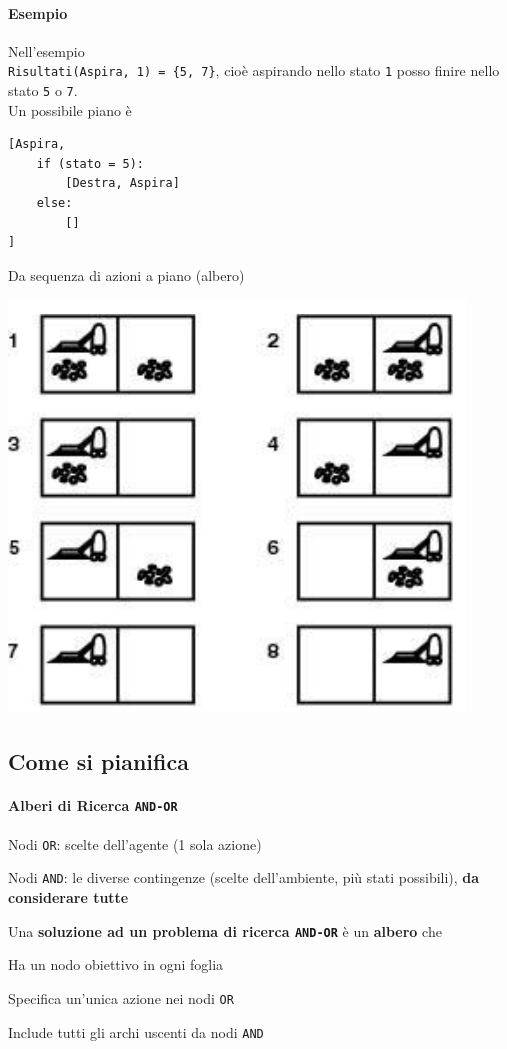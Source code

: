 \documentclass[10pt]{book}
\begin{document}
\paragraph{Esempio}
\begin{multicols}{2}
Nell'esempio\\\texttt{Risultati(Aspira, 1) = \{5, 7\}}, cioè aspirando nello stato \texttt{1} posso finire nello stato \texttt{5} o \texttt{7}.\\
Un possibile piano è
\begin{lstlisting}
[Aspira,
	if (stato = 5):
		[Destra, Aspira]
	else:
		[]
]
\end{lstlisting}
Da sequenza di azioni a piano (albero)
\begin{center}
	\includegraphics[scale=0.7]{aspirapolvereimprevedibile.png}
\end{center}
\end{multicols}
\subsection{Come si pianifica}
\paragraph{Alberi di Ricerca \texttt{AND-OR}}
\begin{list}{}{}
	\item Nodi \texttt{OR}: scelte dell'agente (1 sola azione)
	\item Nodi \texttt{AND}: le diverse contingenze (scelte dell'ambiente, più stati possibili), \textbf{da considerare tutte}
\end{list}
Una \textbf{soluzione ad un problema di ricerca \texttt{AND-OR}} è un \textbf{albero} che
\begin{list}{}{}
	\item Ha un nodo obiettivo in ogni foglia
	\item Specifica un'unica azione nei nodi \texttt{OR}
	\item Include tutti gli archi uscenti da nodi \texttt{AND}
\end{list}
\pagebreak
\end{document}
